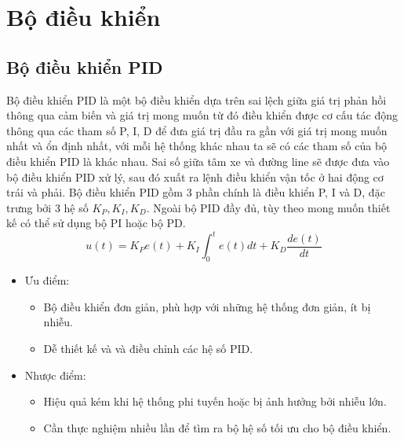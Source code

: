     \section{Bộ điều khiển}
    \subsection{Bộ điều khiển PID}
    \hspace*{0.6cm} Bộ điều khiển PID là một bộ điều khiển dựa trên sai lệch giữa giá trị phản hồi
    thông qua cảm biến và giá trị mong muốn từ đó điều khiển được cơ cấu tác động thông
    qua các tham số P, I, D để đưa giá trị đầu ra gần với giá trị mong muốn nhất và ổn định
    nhất, với mỗi hệ thống khác nhau ta sẽ có các tham số của bộ điều khiển PID là khác
    nhau. Sai số giữa tâm xe và đường line sẽ được đưa vào bộ điều khiển PID xử lý, sau đó
    xuất ra lệnh điều khiển vận tốc ở hai động cơ trái và phải. Bộ điều khiển PID gồm 3
    phần chính là điều khiển P, I và D, đặc trưng bởi 3 hệ số $K_P, K_I, K_D$. Ngoài bộ PID đầy đủ, tùy theo mong muốn thiết kế có thể sử dụng bộ PI hoặc bộ PD.
    \begin{equation*}
        u(t) = K_P e(t) + K_I \int_0^t e(t) dt + K_D \dfrac{de(t)}{dt}
    \end{equation*}
    \begin{itemize}
        \item Ưu điểm: 
        \begin{itemize}[label = \textendash]
            \item Bộ điều khiển đơn giản, phù hợp với những hệ thống đơn giản, ít bị nhiễu.
            \item Dễ thiết kế và và điều chỉnh các hệ số PID.
        \end{itemize}
        \item Nhược điểm:
        \begin{itemize}[label = \textendash]
            \item Hiệu quả kém khi hệ thống phi tuyến hoặc bị ảnh hưởng bởi nhiễu lớn.
            \item Cần thực nghiệm nhiều lần để tìm ra bộ hệ số tối ưu cho bộ điều khiển.
        \end{itemize}
    \end{itemize}
